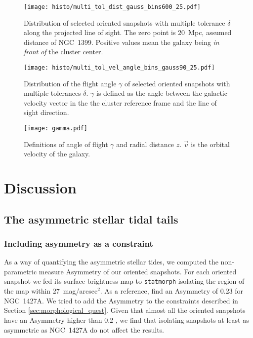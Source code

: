 \begin{figure}
\centering
\texttt{[image: histo/multi\_tol\_dist\_gauss\_bins600\_25.pdf]}
\caption{Distribution of selected oriented snapshots with multiple tolerance $\delta$ along the projected line of sight. The zero point is 20~Mpc, assumed distance of NGC~1399. Positive values mean the galaxy being \emph{in front of} the cluster center. 
}
\label{fig:distance_prediction}
\end{figure}

\begin{figure}
\centering
\texttt{[image: histo/multi\_tol\_vel\_angle\_bins\_gauss90\_25.pdf]}
\caption{Distribution of the flight angle $\gamma$ of selected oriented snapshots with multiple tolerances $\delta$. $\gamma$ is defined as the angle between the galactic velocity vector in the the cluster reference frame and the line of sight direction. 
}
\label{fig:velocity_prediction}
\end{figure}
\begin{figure}
\centering
\texttt{[image: gamma.pdf]}
\caption{Definitions of angle of flight $\gamma$ and radial distance $z$. $\vec v$ is the orbital velocity of the galaxy.
}
\label{fig:gamma}
\end{figure}

\section{Discussion} \label{sec:discussion}

\subsection{The asymmetric stellar tidal tails}

\subsubsection{Including asymmetry as a constraint}
As a way of quantifying the asymmetric stellar tides, we computed the non-parametric measure Asymmetry \citep[as defined by][]{Lotz2004} of our oriented snapshots. For each oriented snapshot we fed its surface brightness map to \verb|statmorph| \citep{Rodriguez-Gomez2019} isolating the region of the map within $27$~mag/arcsec$^2$.
As a reference, \citet{Su2021} find an Asymmetry of $0.23$ for NGC~1427A.
We tried to add the Asymmetry to the constraints described in Section \ref{sec:morphological_quest}. Given that almost all the oriented snapshots have an Asymmetry higher than $0.2$ \citep[in line with the average of $0.53\pm0.22$ for galaxies with intense star formation as reported by][]{Conselice2003}, we find that isolating snapshots at least as asymmetric as NGC~1427A do not affect the results.

